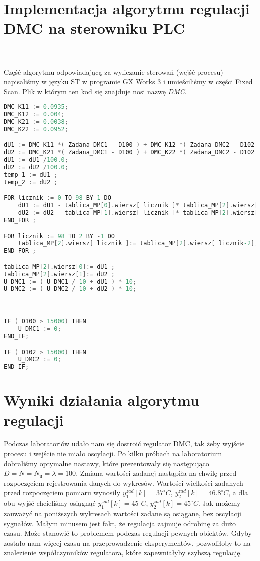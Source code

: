 \section{Implementacja algorytmu regulacji DMC na sterowniku PLC}
\label{thermal_dmc_impl}
~\\\\Część algorytmu odpowiadającą za wyliczanie sterowań (wejść procesu) napisaliśmy w języku ST w programie GX Works 3 i umieściliśmy w części Fixed Scan. Plik w którym ten kod się znajduje nosi nazwę \textit{DMC}.
\begin{lstlisting}[caption={Kod obliczający sterownanie dla regulatora dwuwymiarowego DMC (GX Works)}, language=C]
DMC_K11 := 0.0935;
DMC_K12 := 0.004;
DMC_K21 := 0.0038;
DMC_K22 := 0.0952;

dU1 := DMC_K11 *( Zadana_DMC1 - D100 ) + DMC_K12 *( Zadana_DMC2 - D102 ) ;
dU2 := DMC_K21 *( Zadana_DMC1 - D100 ) + DMC_K22 *( Zadana_DMC2 - D102 ) ;
dU1 := dU1 /100.0;
dU2 := dU2 /100.0;
temp_1 := dU1 ;
temp_2 := dU2 ;

FOR licznik := 0 TO 98 BY 1 DO
	dU1 := dU1 - tablica_MP[0].wiersz[ licznik ]* tablica_MP[2].wiersz[ licznik ];
	dU2 := dU2 - tablica_MP[1].wiersz[ licznik ]* tablica_MP[2].wiersz[ licznik ];
END_FOR ;

FOR licznik := 98 TO 2 BY -1 DO
	tablica_MP[2].wiersz[ licznik ]:= tablica_MP[2].wiersz[ licznik-2];
END_FOR ;

tablica_MP[2].wiersz[0]:= dU1 ;
tablica_MP[2].wiersz[1]:= dU2 ;
U_DMC1 := ( U_DMC1 / 10 + dU1 ) * 10; 
U_DMC2 := ( U_DMC2 / 10 + dU2 ) * 10; 



IF ( D100 > 15000) THEN
	U_DMC1 := 0;
END_IF;

IF ( D102 > 15000) THEN
	U_DMC2 := 0;
END_IF;
\end{lstlisting}

\section{Wyniki działania algorytmu regulacji}
\label{thermal_dmc_wyniki}
Podczas laboratoriów udało nam się dostroić regulator DMC, tak żeby wyjście procesu i wejście  nie miało oscylacji. Po kilku próbach na laboratorium dobraliśmy optymalne nastawy, które prezentowały się następująco $D=N=N_{\mathrm{u}}=\lambda=100$. Zmiana wartości zadanej nastąpiła na chwilę przed rozpoczęciem rejestrowania danych do wykresów. Wartości wielkości zadanych przed rozpoczęciem pomiaru wynosiły $y_{\mathrm{1}}^{zad}[k] = 37^{\circ} C$, $y_{\mathrm{2}}^{zad}[k] = \num{46.8}^{\circ} C$, a dla obu wyjść chcieliśmy osiągnąć $y_{\mathrm{1}}^{zad}[k] = 45^{\circ} C$, $y_{\mathrm{2}}^{zad}[k] = 45^{\circ} C$. Jak możemy zauważyć na poniższych wykresach wartości zadane są osiągane, bez oscylacji sygnałów. Małym minusem jest fakt, że regulacja zajmuje odrobinę za dużo czasu. Może stanowić to problemem podczas regulacji pewnych obiektów. Gdyby zostało nam więcej czasu na przeprowadzenie eksperymentów, pozwoliłoby to na znalezienie współczynników regulatora, które zapewniałyby szybszą regulację.  


